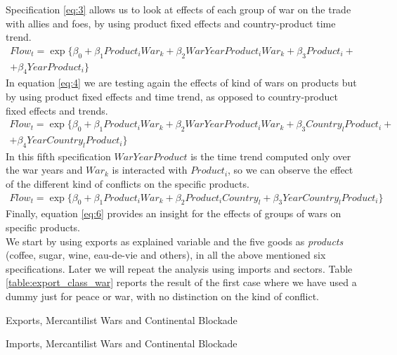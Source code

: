 \documentclass[12pt,a4paper,notitlepage,english]{article}
\begin{document}
Specification \ref{eq:3} allows us to look at effects of each group of war on the trade with allies and foes, by using product fixed effects and country-product time trend.
\begin{multline}\label{eq:4}
Flow_{t}=\exp\{\beta_0+\beta_1Product_iWar_k + \beta_2WarYearProduct_iWar_k+\beta_3Product_i +\\ +\beta_4YearProduct_i\}
\end{multline}
In equation \ref{eq:4} we are testing again the effects of kind of wars on products but by using product fixed effects and time trend, as opposed to country-product fixed effects and trends.
\begin{multline}\label{eq:5}
Flow_{t}=\exp\{\beta_0+\beta_1Product_iWar_k + \beta_2WarYearProduct_iWar_k+\beta_3Country_lProduct_i +\\ +\beta_4YearCountry_lProduct_i\}
\end{multline}
In this fifth specification $WarYearProduct$ is the time trend computed only over the war years and $War_k$ is interacted with $Product_i$, so we can observe the effect of the different kind of conflicts on the specific products.
\begin{multline}\label{eq:6}
Flow_{t}=\exp\{\beta_0+\beta_1Product_iWar_k + \beta_2Product_iCountry_l+\beta_3YearCountry_lProduct_i\}
\end{multline}
Finally, equation \ref{eq:6} provides an insight for the effects of groups of wars on specific products. \\
We start by using exports as explained variable and the five goods as \textit{products} (coffee, sugar, wine, eau-de-vie and others), in all the above mentioned six specifications.
Later we will repeat the analysis using imports and sectors.
Table \ref{table:export_class_war} reports the result of the first case where we have used a dummy just for peace or war, with no distinction on the kind of conflict.
\begin{table}
\begin{center}
\caption {Exports, Mercantilist Wars and Continental Blockade} 
\label{table:export_class_block}
\renewcommand{\arraystretch}{0.6}

\end{center}
\end{table}
\begin{table}
\begin{center}
\caption {Imports, Mercantilist Wars and Continental Blockade} 
\label{table:import_class_block}
\renewcommand{\arraystretch}{0.6}

\end{center}
\end{table}
\end{document}
